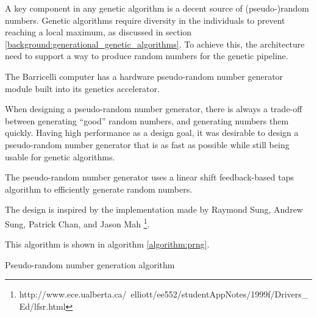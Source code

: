A key component in any genetic algorithm is a decent source of (pseudo-)random numbers.
Genetic algorithms require diversity in the individuals to prevent reaching a local maximum, as discussed in section \ref{background:generational_genetic_algorithms}. 
To achieve this, the architecture need to support a way to produce random numbers for the genetic pipeline.   

The Barricelli computer has a hardware pseudo-random number generator module built into its genetics accelerator.

When designing a pseudo-random number generator, there is always a trade-off between generating ``good'' random numbers, and generating numbers them quickly.
Having high performance as a design goal\cn, it was desirable to design a pseudo-random number generator that is as fast as possible while still being usable for genetic algorithms.

The pseudo-random number generator uses a linear shift feedback-based taps algorithm to efficiently generate random numbers.

The design is inspired by the implementation made by Raymond Sung, Andrew Sung, Patrick Chan, and Jason Mah \footnote{http://www.ece.ualberta.ca/~elliott/ee552/studentAppNotes/1999f/Drivers\_Ed/lfsr.html}. 

This algorithm is shown in algorithm \vref{algorithm:prng}.

\begin{algorithm}[H]
\SetAlgoLined
\DontPrintSemicolon
{}
\caption{Pseudo-random number generation algorithm}
\label{algorithm:prng}
\end{algorithm}

